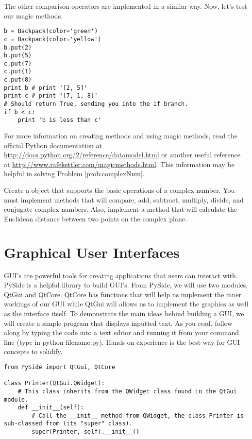 The other comparison operators are implemented in a similar way.
Now, let's test our magic methods.

\begin{lstlisting}
b = Backpack(color='green')
c = Backpack(color='yellow')
b.put(2)
b.put(5)
c.put(7)
c.put(1)
c.put(8)
print b # print '[2, 5]'
print c # print '[7, 1, 8]'
# Should return True, sending you into the if branch.
if b < c:
	print 'b is less than c'

\end{lstlisting}

For more information on creating methods and using magic methods, read the official Python documentation at \url {http://docs.python.org/2/reference/datamodel.html} or another useful reference at \url{http://www.rafekettler.com/magicmethods.html}.
This information may be helpful in solving Problem \ref{prob:complexNum}.

\begin{problem}
Create a  object that supports the basic operations of a complex number.
You must implement methods that will compare, add, subtract, multiply, divide, and conjugate complex numbers.
Also, implement a  method that will calculate the Euclidean distance between two points on the complex plane.
\label{prob:complexNum}
\end{problem}

\section*{Graphical User Interfaces}

GUI's are powerful tools for creating applications that users can interact with.
PySide is a helpful library to build GUI's.
From PySide, we will use two modules, QtGui and QtCore.
QtCore has functions that will help us implement the inner workings of our GUI while QtGui will allows us to implement the graphics as well as the interface itself.
To demonstrate the main ideas behind building a GUI, we will create a simple program that displays inputted text. As you read, follow along by typing the code into a text editor and running it from your command line (type in python filename.py). Hands on experience is the best way for GUI concepts to solidify.

\begin{lstlisting}
from PySide import QtGui, QtCore

class Printer(QtGui.QWidget):
	# This class inherits from the QWidget class found in the QtGui module.
	def __init__(self):
		# Call the __init__ method from QWidget, the class Printer is sub-classed from (its "super" class).
		super(Printer, self).__init__()

\end{lstlisting}

